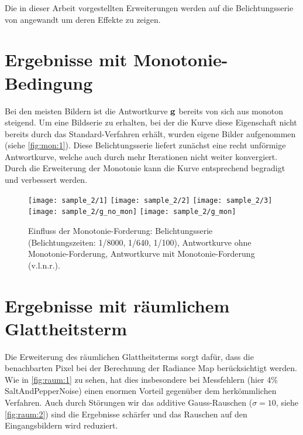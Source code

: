 Die in dieser Arbeit vorgestellten Erweiterungen werden auf die Belichtungsserie von \cite{tellone} angewandt um deren Effekte zu zeigen.




\section{Ergebnisse mit \gls{Monotonie}-Bedingung}

Bei den meisten Bildern ist die Antwortkurve $\mathbf g$ bereits von sich aus monoton steigend. Um eine Bildserie zu erhalten, bei der die Kurve diese Eigenschaft nicht bereits durch das Standard-Verfahren erhält, wurden eigene Bilder aufgenommen (siehe \autoref{fig:mon:1}). Diese Belichtungsserie liefert zunächst eine recht unförmige Antwortkurve, welche auch durch mehr Iterationen nicht weiter konvergiert. Durch die Erweiterung der Monotonie kann die Kurve entsprechend begradigt und verbessert werden.

\begin{figure}
  \begin{center}
    \texttt{[image: sample\_2/1]}
    \texttt{[image: sample\_2/2]}
    \texttt{[image: sample\_2/3]}
    \texttt{[image: sample\_2/g\_no\_mon]}
    \texttt{[image: sample\_2/g\_mon]}
    \caption{Einfluss der Monotonie-Forderung: Belichtungsserie (Belichtungszeiten: 1/8000, 1/640, 1/100),  Antwortkurve ohne Monotonie-Forderung, Antwortkurve mit Monotonie-Forderung  (v.l.n.r.).}
    \label{fig:mon:1}
  \end{center}
\end{figure}



\section{Ergebnisse mit räumlichem Glattheitsterm}

Die Erweiterung des räumlichen Glattheitsterms sorgt dafür, dass die benachbarten Pixel bei der Berechnung der \gls{Radiance Map} berücksichtigt werden. Wie in \autoref{fig:raum:1} zu sehen, hat dies insbesondere bei Messfehlern (hier 4\% \gls{SaltAndPepperNoise}) einen enormen Vorteil gegenüber dem herkömmlichen Verfahren. Auch durch Störungen wir das additive Gauss-Rauschen ($\sigma=10$, siehe \autoref{fig:raum:2}) sind die Ergebnisse schärfer und das Rauschen auf den Eingangsbildern wird reduziert.


